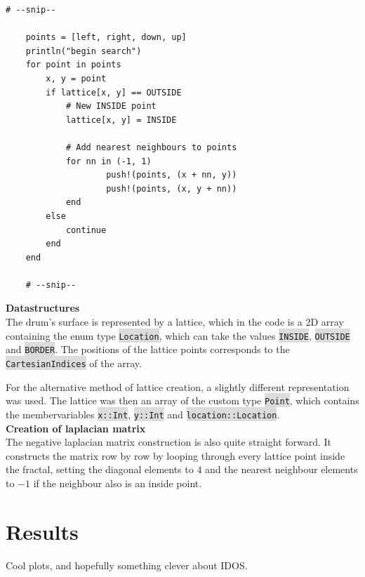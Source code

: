 \documentclass{article}
\begin{document}
\begin{lstlisting}[label=lst:lattice-bfs]
    # --snip--    

    points = [left, right, down, up] 
    println("begin search")
    for point in points
        x, y = point
        if lattice[x, y] == OUTSIDE
            # New INSIDE point
            lattice[x, y] = INSIDE

            # Add nearest neighbours to points
            for nn in (-1, 1)
                    push!(points, (x + nn, y)) 
                    push!(points, (x, y + nn))
            end
        else
            continue
        end
    end 

    # --snip--    
\end{lstlisting}

\noindent
\textbf{Datastructures}\\
The drum's surface is represented by a lattice, which in the code is a 2D array containing the enum type \colorbox{gainsboro}{\lstinline{Location}}, which can take the values \colorbox{gainsboro}{\lstinline{INSIDE}}, \colorbox{gainsboro}{\lstinline{OUTSIDE}} and \colorbox{gainsboro}{\lstinline{BORDER}}. The positions of the lattice points corresponds to the \colorbox{gainsboro}{\lstinline{CartesianIndices}} of the array.

For the alternative method of lattice creation, a slightly different representation was used. The lattice was then an array of the custom type \colorbox{gainsboro}{\lstinline{Point}}, which contains the membervariables \colorbox{gainsboro}{\lstinline{x::Int}}, \colorbox{gainsboro}{\lstinline{y::Int}} and \colorbox{gainsboro}{\lstinline{location::Location}}.\\

\noindent
\textbf{Creation of laplacian matrix}\\
The negative laplacian matrix construction is also quite straight forward. It constructs the matrix row by row by looping through every lattice point inside the fractal, setting the diagonal elements to $4$ and the nearest neighbour elements to $-1$ if the neighbour also is an inside point.\\


\section{Results}
Cool plots, and hopefully something clever about IDOS.
\end{document}
